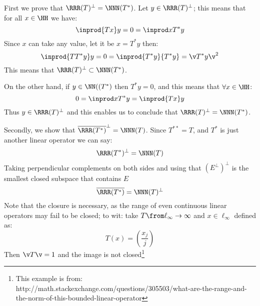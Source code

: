 First we prove that $\RRR(T)^\perp = \NNN(T^*)$. Let $y\in \RRR(T)^\perp$; this means that for all $x\in \HH$ we have:
$$\inprod {Tx}y=0 = \inprod x{T^*y}$$
Since $x$ can take any value, let it be $x=T^*y$ then:
$$\inprod {TT^*y}y=0 = \inprod {T^*y}{T^*y}=\v T^*y\v^2$$
This means that $\RRR(T)^\perp \subset \NNN(T^*)$.

On the other hand, if $y\in \NN((T^*)$ then $T^*y=0$, and this means that $\forall x\in \HH$:
$$0=\inprod x{T^*y} = \inprod {Tx}y $$
Thus $y\in \RRR(T)^\perp$ and this enables us to conclude that $\RRR(T)^\perp = \NNN(T^*)$.

Secondly, we show that $\overline{\RRR(T^*)}^\perp = \NNN(T)$. Since  $T^{**}=T$, and $T^*$ is just another linear operator we can say:
$$\RRR(T^*)^\perp = \NNN(T)$$
Taking perpendicular complements on both sides and using that $(E^\perp)^\perp$ is the smallest closed subspace that contains $E$
$$\overline{\RRR(T^*)}= \NNN(T)^\perp $$
Note that the closure is necessary, as the range of even continuous linear operators may fail to be closed; to wit: take $T\from \ell_\infty \to \infty$ and $x\in \ell_\infty$ defined as:
$$T(x) = \left( \frac{x_j}{j} \right)$$
Then $\v T \v=1$ and the image is not closed\footnote{This example is from: http://math.stackexchange.com/questions/305503/what-are-the-range-and-the-norm-of-this-bounded-linear-operator}


